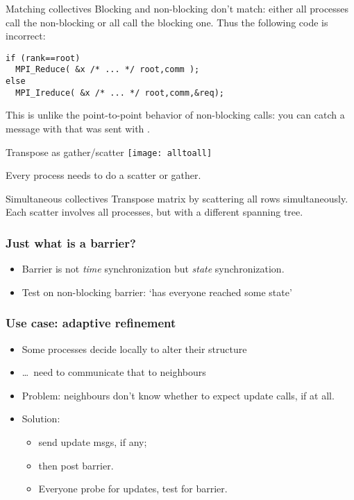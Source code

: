 \begin{frame}[containsverbatim]{Matching collectives}
  \label{sl:coll-nonblock-match}
  Blocking and non-blocking don't match: either all processes
  call the non-blocking or all call the blocking one.
  Thus the following code is incorrect:
\begin{lstlisting}
if (rank==root)
  MPI_Reduce( &x /* ... */ root,comm );
else
  MPI_Ireduce( &x /* ... */ root,comm,&req);
\end{lstlisting}
  This is unlike the point-to-point behavior of non-blocking calls:
  you can catch a message with 
  that was sent with .
\end{frame}

\begin{frame}{Transpose as gather/scatter}
  \texttt{[image: alltoall]}

  Every process needs to do a scatter or gather.
\end{frame}

\begin{frame}[containsverbatim]{Simultaneous collectives}
  Transpose matrix by scattering all rows simultaneously.\\
  Each scatter involves all processes, but with a
  different spanning tree.

\end{frame}


\begin{frame}[containsverbatim]\frametitle{Just what is a barrier?}
  \begin{itemize}
  \item Barrier is not \emph{time} synchronization but \emph{state}
    synchronization.
  \item Test on non-blocking barrier: `has everyone reached some
    state'
  \end{itemize}
\end{frame}

\begin{frame}[containsverbatim]\frametitle{Use case: adaptive refinement}
  \begin{itemize}
  \item Some processes decide locally to alter their structure
  \item \ldots~need to communicate that to neighbours
  \item Problem: neighbours don't know whether to expect update calls,
    if at all.
  \item Solution:
    \begin{itemize}
    \item send update msgs, if any;
    \item then post barrier.
    \item Everyone probe for updates, test for barrier.    
    \end{itemize}
  \end{itemize}
\end{frame}


